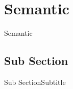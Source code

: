 \section{Semantic}
\begin{frame}{Semantic}

\end{frame}

\subsection{Sub Section}
\begin{frame}{Sub Section}{Subtitle}

\end{frame}